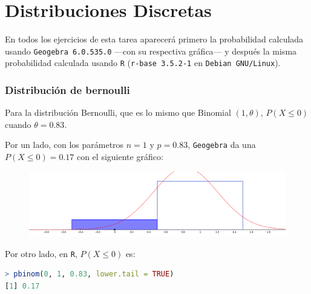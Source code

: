  


	\thispagestyle{plain}
\chapter*{Distribuciones Discretas}
	{\noindent En todos los ejercicios de esta tarea aparecerá primero la probabilidad calculada usando \texttt{Geogebra 6.0.535.0} ---con su respectiva gráfica--- y después la misma probabilidad calculada usando \texttt{R} (\texttt{r-base 3.5.2-1} en \texttt{Debian GNU/Linux})}. 
	\vspace{.5em}
	\subsection{Distribución de bernoulli}
	\begin{ejer}[0,5]
		Para la distribución Bernoulli, que es lo mismo que Binomial $(1, \theta)$, $P(X \leq 0)$ cuando $\theta = 0.83$.
	\end{ejer}
	\begin{sol}
		Por un lado, con los parámetros $n=1$ y $p=0.83$, \texttt{Geogebra} da una $P(X\leq 0) = 0.17$ con el siguiente gráfico:
		\begin{figure}[H]
			\includegraphics[width=0.5\linewidth]{pics/g1}
			\centering
		\end{figure}
		\noindent Por otro lado, en \texttt{R}, $P(X\leq 0)$ es:
		\begin{lstlisting}[language=R]
> pbinom(0, 1, 0.83, lower.tail = TRUE)
[1] 0.17
		\end{lstlisting}
	\end{sol}
